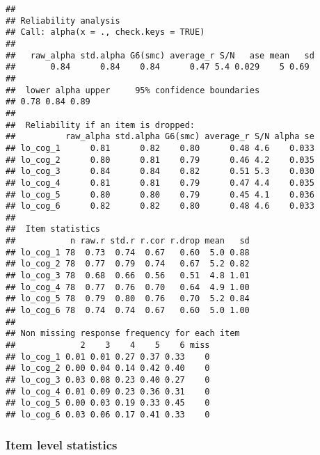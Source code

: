 \documentclass[]{article}
\newenvironment{Shaded}{\begin{snugshade}}{\end{snugshade}}
\newcommand{\KeywordTok}[1]{\textcolor[rgb]{0.13,0.29,0.53}{\textbf{#1}}}
\newcommand{\DataTypeTok}[1]{\textcolor[rgb]{0.13,0.29,0.53}{#1}}
\newcommand{\DecValTok}[1]{\textcolor[rgb]{0.00,0.00,0.81}{#1}}
\newcommand{\StringTok}[1]{\textcolor[rgb]{0.31,0.60,0.02}{#1}}
\newcommand{\CommentTok}[1]{\textcolor[rgb]{0.56,0.35,0.01}{\textit{#1}}}
\newcommand{\OperatorTok}[1]{\textcolor[rgb]{0.81,0.36,0.00}{\textbf{#1}}}
\newcommand{\NormalTok}[1]{#1}
\begin{document}
\begin{verbatim}
## 
## Reliability analysis   
## Call: alpha(x = ., check.keys = TRUE)
## 
##   raw_alpha std.alpha G6(smc) average_r S/N   ase mean   sd
##       0.84      0.84    0.84      0.47 5.4 0.029    5 0.69
## 
##  lower alpha upper     95% confidence boundaries
## 0.78 0.84 0.89 
## 
##  Reliability if an item is dropped:
##          raw_alpha std.alpha G6(smc) average_r S/N alpha se
## lo_cog_1      0.81      0.82    0.80      0.48 4.6    0.033
## lo_cog_2      0.80      0.81    0.79      0.46 4.2    0.035
## lo_cog_3      0.84      0.84    0.82      0.51 5.3    0.030
## lo_cog_4      0.81      0.81    0.79      0.47 4.4    0.035
## lo_cog_5      0.80      0.80    0.79      0.45 4.1    0.036
## lo_cog_6      0.82      0.82    0.80      0.48 4.6    0.033
## 
##  Item statistics 
##           n raw.r std.r r.cor r.drop mean   sd
## lo_cog_1 78  0.73  0.74  0.67   0.60  5.0 0.88
## lo_cog_2 78  0.77  0.79  0.74   0.67  5.2 0.82
## lo_cog_3 78  0.68  0.66  0.56   0.51  4.8 1.01
## lo_cog_4 78  0.77  0.76  0.70   0.64  4.9 1.00
## lo_cog_5 78  0.79  0.80  0.76   0.70  5.2 0.84
## lo_cog_6 78  0.74  0.74  0.67   0.60  5.0 1.00
## 
## Non missing response frequency for each item
##             2    3    4    5    6 miss
## lo_cog_1 0.01 0.01 0.27 0.37 0.33    0
## lo_cog_2 0.00 0.04 0.14 0.42 0.40    0
## lo_cog_3 0.03 0.08 0.23 0.40 0.27    0
## lo_cog_4 0.01 0.09 0.23 0.36 0.31    0
## lo_cog_5 0.00 0.03 0.19 0.33 0.45    0
## lo_cog_6 0.03 0.06 0.17 0.41 0.33    0
\end{verbatim}

\begin{Shaded}
\end{Shaded}

\subsubsection{Item level statistics}\label{item-level-statistics}
\end{document}
